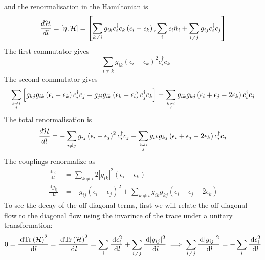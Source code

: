 \documentclass[12pt,twoside]{article}
\numberwithin{equation}{section}
\begin{document}
and the renormalisation in the Hamiltonian is
\begin{equation}
	\frac{d\mathcal{H}}{dl} = \left[\eta, \mathcal{H}\right] = \left[\sum_{k\neq i} g_{ik}c^\dagger_i c_k \left(\epsilon_i - \epsilon_k\right), \sum_i \epsilon_i \hat n_i + \sum_{i\neq j} g_{ij}c^\dagger_i c_j\right]
\end{equation}
The  first commutator gives 
\begin{equation}
	-\sum_{i\neq k} g_{ik}\left(\epsilon_i - \epsilon_k\right)^2 c^\dagger_i c_k
\end{equation}
The second commutator gives
\begin{equation}
	\sum_{k\neq i\atop{j}}\left[g_{kj}g_{ik}\left(\epsilon_i - \epsilon_k\right) c^\dagger_i c_j + g_{ji}g_{ik}\left( \epsilon_k - \epsilon_i \right) c^\dagger_j c_k\right] = \sum_{k\neq i\atop{j}}g_{ik}g_{kj}\left( \epsilon_i + \epsilon_j - 2\epsilon_k \right) c^\dagger_i c_j
\end{equation}
The total renormalisation is
\begin{equation}
	\frac{d\mathcal{H}}{dl} = -\sum_{i\neq j} g_{ij}\left(\epsilon_i - \epsilon_j\right)^2 c^\dagger_i c_j + \sum_{k\neq i\atop{j}}g_{ik}g_{kj}\left( \epsilon_i + \epsilon_j - 2\epsilon_k \right) c^\dagger_i c_j
\end{equation}
The couplings renormalize as
\begin{equation}\begin{aligned}
	\frac{\:\mathrm{d}\epsilon_i}{\:\mathrm{d}l} &= \sum_{k \neq i} 2|g_{ik}|^2\left( \epsilon_i - \epsilon_k \right)\\
	\frac{\:\mathrm{d}g_{ij}}{\:\mathrm{d}l} &= - g_{ij}\left(\epsilon_i - \epsilon_j\right)^2 + \sum_{k \neq i}g_{ik}g_{kj}\left( \epsilon_i + \epsilon_j - 2\epsilon_k \right)
\end{aligned}\end{equation}
To see the decay of the off-diagonal terms, first we will relate the off-diagonal flow to the diagonal flow using the invarince of the trace under a unitary transformation:
\begin{equation}\begin{aligned}
	0 = \frac{\:\mathrm{d}\text{Tr}\left( \mathcal{H} \right) ^2}{\:\mathrm{d}l} = \frac{\:\mathrm{d}\text{Tr}\left( \mathcal{H} \right) ^2}{\:\mathrm{d}l} = \sum_i \frac{\:\mathrm{d} \epsilon_i^2 }{\:\mathrm{d}l} + \sum_{i\neq j}\frac{\:\mathrm{d}|g_{ij}|^2}{\:\mathrm{d}l} \implies \sum_{i\neq j}\frac{\:\mathrm{d}|g_{ij}|^2}{\:\mathrm{d}l} = -\sum_i \frac{\:\mathrm{d} \epsilon_i^2 }{\:\mathrm{d}l}
\end{aligned}\end{equation}
\end{document}
